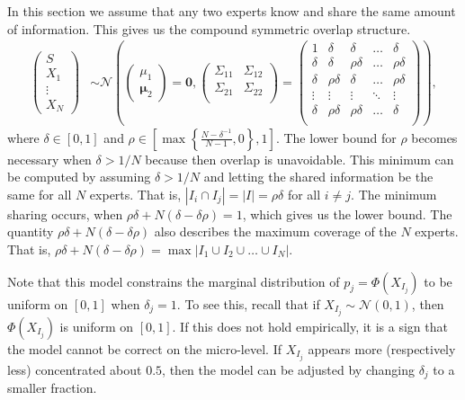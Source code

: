 \documentclass[11pt,twoside]{article}
\begin{document}
In this section we assume that any two experts know and share the same amount of information. This gives us the compound symmetric overlap structure.
\begin{align*}
\left(\begin{matrix} S \\ X_1\\ \vdots \\ X_N \end{matrix}\right) &\sim \mathcal{N}\left( \left(\begin{matrix} 
\mu_1 \\ \boldsymbol{\mu}_2
 \end{matrix}\right) =
 \boldsymbol{0}, \left(\begin{matrix} 
\Sigma_{11} & \Sigma_{12}\\
\Sigma_{21} & \Sigma_{22}\\
 \end{matrix}\right) 
 =
 \left(\begin{array}{c|cccc}
1 & \delta & \delta & \dots & \delta  \\ \hline
\delta & \delta &\rho\delta & \dots & \rho\delta   \\ 
\delta & \rho\delta & \delta & \dots & \rho\delta  \\ 
\vdots & \vdots & \vdots & \ddots & \vdots  \\ 
\delta & \rho\delta & \rho\delta & \dots & \delta\\ 
 \end{array}\right)\right),
\end{align*}
where $\delta \in [0,1]$ and $\rho \in \left[  \max \left\{ \frac{N-\delta^{-1}}{N-1}, 0\right\}, 1 \right]$. The lower bound for $\rho$ becomes necessary when $\delta > 1/N$ because then overlap is unavoidable. This minimum can be computed by assuming $\delta > 1/N$ and letting the shared information be the same for all $N$ experts. That is, $|I_{i} \cap I_j| = |I| =  \rho \delta$ for all $i \neq j$. The minimum sharing occurs, when $\rho\delta + N(\delta - \delta\rho) = 1$, which gives us the lower bound. The quantity  $\rho\delta + N(\delta - \delta\rho)$ also describes the maximum coverage of the $N$ experts. That is, $\rho\delta + N(\delta - \delta\rho) = \max | I_1 \cup I_2 \cup \dots \cup I_N|$. 

Note that this model constrains the marginal distribution of $p_j = \Phi(X_{I_j})$ to be uniform on $[0,1]$ when $\delta_j = 1$. To see this, recall that if $X_{I_j} \sim \mathcal{N}(0,1)$, then $\Phi(X_{I_j})$ is uniform on $[0,1]$. If this does not hold empirically, it is a sign that the model cannot be correct on the micro-level. If $X_{I_j}$ appears more (respectively less) concentrated about $0.5$, then the model can be adjusted by changing $\delta_{j}$ to a smaller fraction. 
\end{document}
